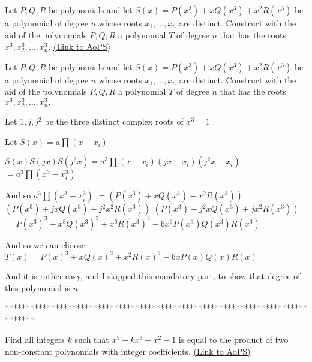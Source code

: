 \begin{problem}
	Let $P,Q,R$ be polynomials and let $S(x) = P(x^3) + xQ(x^3) + x^2R(x^3)$ be a polynomial of degree $n$ whose roots $x_1,\ldots, x_n$ are distinct. Construct with the aid of the polynomials $P,Q,R$ a polynomial $T$ of degree $n$ that has the roots $x_1^3 , x_2^3 , \ldots, x_n^3.$
	\flushright \href{https://artofproblemsolving.com/community/c6h407855}{(Link to AoPS)}
\end{problem}



\begin{solution}
	\begin{tcolorbox}Let $P,Q,R$ be polynomials and let $S(x) = P(x^3) + xQ(x^3) + x^2R(x^3)$ be a polynomial of degree $n$ whose roots $x_1,\ldots, x_n$ are distinct. Construct with the aid of the polynomials $P,Q,R$ a polynomial $T$ of degree $n$ that has the roots $x_1^3 , x_2^3 , \ldots, x_n^3.$\end{tcolorbox}
Let $1,j,j^2$ be the three distinct complex roots of $x^3=1$

Let $S(x)=a\prod(x-x_i)$

$S(x)S(jx)S(j^2x)=a^3\prod (x-x_i)(jx-x_i)(j^2x-x_i)$ $=a^3\prod(x^3-x_i^3)$ 

And so $a^3\prod(x^3-x_i^3)$ $=(P(x^3)+xQ(x^3)+x^2R(x^3))$ $(P(x^3)+jxQ(x^3)+j^2x^2R(x^3))$ $(P(x^3)+j^2xQ(x^3)+jx^2R(x^3))$
 $=P(x^3)^3+x^3Q(x^3)^3+x^6R(x^3)^3-6x^3P(x^3)Q(x^3)R(x^3)$

And so we can choose $\boxed{T(x)=P(x)^3+xQ(x)^3+x^2R(x)^3-6xP(x)Q(x)R(x)}$

And it is rather easy, and I skipped this mandatory part, to show that degree of this polynomial is $n$
\end{solution}
*******************************************************************************
-------------------------------------------------------------------------------

\begin{problem}
	Find all integers $k$ such that $x^5-kx^3+x^2-1$ is equal to the product of two non-constant polynomials with integer coefficients.
	\flushright \href{https://artofproblemsolving.com/community/c6h409616}{(Link to AoPS)}
\end{problem}




